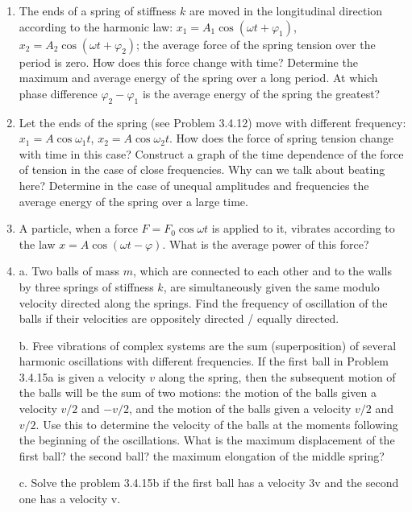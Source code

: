 \documentclass{article}
\begin{document}
\begin{enumerate}[label=3.4.\arabic*]
\item The ends of a spring of stiffness $k$ are moved in the longitudinal direction according to the harmonic law: $x_1 = A_1 \cos{(\omega t + \varphi_1)}$, $x_2 = A_2 \cos{(\omega t + \varphi_2)}$; the average force of the spring tension over the period is zero. How does this force change with time? Determine the maximum and average energy of the spring over a long period. At which phase difference $\varphi_2 - \varphi_1$ is the average energy of the spring the greatest?

\item Let the ends of the spring (see Problem 3.4.12) move with different frequency: $x_1 = A \cos{\omega_1 t}$, $x_2 = A \cos{\omega_2 t}$. How does the force of spring tension change with time in this case? Construct a graph of the time dependence of the force of tension in the case of close frequencies. Why can we talk about beating here? Determine in the case of unequal amplitudes and frequencies the average energy of the spring over a large time.

\item A particle, when a force $F = F_0 \cos{\omega t}$ is applied to it, vibrates according to the law $x = A \cos{(\omega t - \varphi)}$. What is the average power of this force?

\item a. Two balls of mass $m$, which are connected to each other and to the walls by three springs of stiffness $k$, are simultaneously given the same modulo velocity directed along the springs. Find the frequency of oscillation of the balls if their velocities are oppositely directed / equally directed. 

b. Free vibrations of complex systems are the sum (superposition) of several harmonic oscillations with different frequencies. If the first ball in Problem 3.4.15a is given a velocity $v$ along the spring, then the subsequent motion of the balls will be the sum of two motions: the motion of the balls given a velocity $v/2$ and $-v/2$, and the motion of the balls given a velocity $v/2$ and $v/2$. Use this to determine the velocity of the balls at the moments following the beginning of the oscillations. What is the maximum displacement of the first ball? the second ball? the maximum elongation of the middle spring? 

c. Solve the problem 3.4.15b if the first ball has a velocity 3v and the second one has a velocity v.



\end{enumerate}
\end{document}
